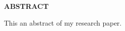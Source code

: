 
\newenvironment{myabstract}
{%
    \thispagestyle{empty}%
    \vspace*{\stretch{2}}%
    \justifying      %
}
{\par %
    \vspace{\stretch{3}} %
    \clearpage           %
}

\section*{}
\begin{myabstract}
    \begin{center}
        {\textbf{ABSTRACT}}
    \end{center}
    This an abstract of my research paper.
\end{myabstract}
